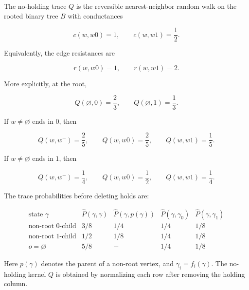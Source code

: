 \documentclass[11pt,a4paper]{scrartcl}
\begin{document}
\begin{proposition}\label{prop:trace-kernel}
The no-holding trace \(Q\) is the reversible
nearest-neighbor random walk on the rooted binary tree \(B\) with conductances

\[
c(w,w0)=1,
\qquad
c(w,w1)=\frac12 .
\]

Equivalently, the edge resistances are

\[
r(w,w0)=1,
\qquad
r(w,w1)=2 .
\]

More explicitly, at the root,

\[
Q(\varnothing,0)=\frac23,
\qquad
Q(\varnothing,1)=\frac13 .
\]

If \(w\ne\varnothing\) ends in \(0\), then

\[
Q(w,w^-)=\frac25,
\qquad
Q(w,w0)=\frac25,
\qquad
Q(w,w1)=\frac15 .
\]

If \(w\ne\varnothing\) ends in \(1\), then

\[
Q(w,w^-)=\frac14,
\qquad
Q(w,w0)=\frac12,
\qquad
Q(w,w1)=\frac14 .
\]

The trace probabilities before deleting holds are:

\[
\begin{array}{c|c|c|c|c}
\text{state } \gamma
& \widehat P(\gamma,\gamma)
& \widehat P(\gamma,p(\gamma))
& \widehat P(\gamma,\gamma_0)
& \widehat P(\gamma,\gamma_1)
\\ \hline
\text{non-root }0\text{-child}
& 3/8 & 1/4 & 1/4 & 1/8
\\
\text{non-root }1\text{-child}
& 1/2 & 1/8 & 1/4 & 1/8
\\
o=\varnothing
& 5/8 & - & 1/4 & 1/8
\end{array}
\]

Here \(p(\gamma)\) denotes the parent of a non-root vertex, and
\(\gamma_i=f_i(\gamma)\). The no-holding kernel \(Q\) is obtained by
normalizing each row after removing the holding column.

\end{proposition}
\end{document}
